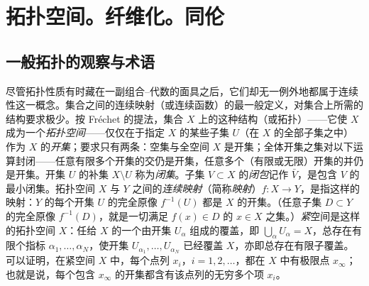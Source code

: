\chapter{拓扑空间。纤维化。同伦}

\section{一般拓扑的观察与术语}


尽管拓扑性质有时藏在一副组合–代数的面具之后，它们却无一例外地都属于连续性这一概念。集合之间的连续映射（或连续函数）的最一般定义，对集合上所需的结构要求极少。按 Fréchet 的提法，集合 $X$ 上的这种结构（或拓扑）——它使 $X$ 成为一个\emph{拓扑空间}——仅仅在于指定 $X$ 的某些子集 $U$（在 $X$ 的全部子集之中）作为 $X$ 的\emph{开集}；要求只有两条：空集与全空间 $X$ 是开集；全体开集之集对以下运算封闭——任意有限多个开集的交仍是开集，任意多个（有限或无限）开集的并仍是开集。开集 $U$ 的补集 $X\setminus U$ 称为\emph{闭集}。子集 $V\subset X$ 的\emph{闭包}记作 $\bar V$，是包含 $V$ 的最小闭集。拓扑空间 $X$ 与 $Y$ 之间的\emph{连续映射}（简称\emph{映射}）$f:X\to Y$，是指这样的映射：$Y$ 的每个开集 $U$ 的完全原像 $f^{-1}(U)$ 都是 $X$ 的开集。（任意子集 $D\subset Y$ 的完全原像 $f^{-1}(D)$，就是一切满足 $f(x)\in D$ 的 $x\in X$ 之集。）\emph{紧}空间是这样的拓扑空间 $X$：任给 $X$ 的一个由开集 $U_\alpha$ 组成的覆盖，即 $\bigcup_\alpha U_\alpha=X$，总存在有限个指标 $\alpha_1,\dots,\alpha_N$，使开集 $U_{\alpha_1},\dots,U_{\alpha_N}$ 已经覆盖 $X$，亦即总存在有限子覆盖。可以证明，在紧空间 $X$ 中，每个点列 $x_i$，$i=1,2,\dots$，都在 $X$ 中有极限点 $x_\infty$；也就是说，每个包含 $x_\infty$ 的开集都含有该点列的无穷多个项 $x_i$。

